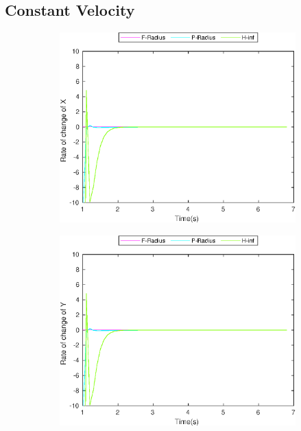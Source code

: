 \subsection{Constant Velocity}
\begin{figure}[!h]
\begin{subfigure}{.5\linewidth}
\centering
\includegraphics[width=\linewidth]{figures/BoundChange/CV/cv_bound_changeX}
\end{subfigure}
\begin{subfigure}{.5\linewidth}
\centering
\includegraphics[width=\linewidth]{figures/BoundChange/CV/cv_bound_changeY}

\end{subfigure}
\end{figure}
